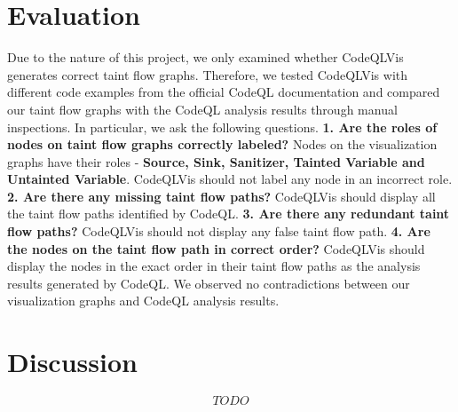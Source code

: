 \documentclass[sigplan,10pt,review]{acmart}
\begin{document}
\section{Evaluation}
Due to the nature of this project, we only examined whether CodeQLVis generates correct taint flow graphs. Therefore, we tested CodeQLVis with different code examples from the official CodeQL documentation and compared our taint flow graphs with the CodeQL analysis results through manual inspections. In particular, we ask the following questions. 
\newline
\newline
\textbf{1. Are the roles of nodes on taint flow graphs correctly labeled? }
\newline
Nodes on the visualization graphs have their roles - \textbf{Source, Sink, Sanitizer, Tainted Variable and Untainted Variable}. CodeQLVis should not label any node in an incorrect role. 
\newline
\newline
\textbf{2. Are there any missing taint flow paths? }
\newline
CodeQLVis should display all the taint flow paths identified by CodeQL.
\newline
\newline
\textbf{3. Are there any redundant taint flow paths? }
\newline
CodeQLVis should not display any false taint flow path.
\newline
\newline
\textbf{4. Are the nodes on the taint flow path in correct order? }
\newline
CodeQLVis should display the nodes in the exact order in their taint flow paths as the analysis results generated by CodeQL.
\newline
\newline
We observed no contradictions between our visualization graphs and CodeQL analysis results. 
\section{Discussion}
\[TODO\]
\end{document}

